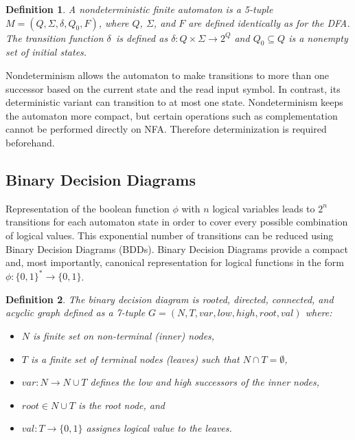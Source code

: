 \documentclass[pdflatex,sn-mathphys-num]{sn-jnl}%
\theoremstyle{thmstyleone}%
\theoremstyle{thmstyletwo}%
\theoremstyle{thmstylethree}%
\newtheorem{definition}{Definition}%
\begin{document}
        \begin{definition}
            A nondeterministic finite automaton is a 5-tuple $M = (Q, \Sigma, \delta, Q_0, F)$, where $Q$, $\Sigma$, and $F$ are defined identically as for the DFA. The transition function $\delta$~is defined as $\delta : Q \times \Sigma \rightarrow 2^{Q}$ and $Q_0 \subseteq Q$ is a nonempty set of initial states.
        \end{definition}

        Nondeterminism allows the automaton to make transitions to more than one successor based on the current state and the read input symbol. In contrast, its deterministic variant can transition to at most one state. Nondeterminism keeps the automaton more compact, but certain operations such as complementation cannot be performed directly on NFA. Therefore determinization is required beforehand.

    \subsection{Binary Decision Diagrams}
        Representation of the boolean function $\phi$ with $n$ logical variables leads to $2^n$ transitions for each automaton state in order to cover every possible combination of logical values. This exponential number of transitions can be reduced using Binary Decision Diagrams (BDDs). Binary Decision Diagrams provide a compact and, most importantly, canonical representation for logical functions in the form $\phi: \{0, 1\}^* \rightarrow \{0, 1\}$.

        \vspace*{0.5em}

        \begin{definition}
            The binary decision diagram \cite{BDD} is rooted, directed, connected, and acyclic graph defined as a 7-tuple $G = (N, T, var, low, high, root, val)$ where:
            \begin{itemize}[noindent]
                \item $N$ is finite set on non-terminal (inner) nodes,
                \item $T$ is a finite set of terminal nodes (leaves) such that $N \cap T = \emptyset$,
                \item $var : N \rightarrow N \cup T$ defines the low and high successors of the inner nodes,
                \item $root \in N \cup T$ is the root node, and
                \item $val : T \rightarrow \{0, 1\}$ assignes logical value to the leaves.
            \end{itemize}
        \end{definition}
\end{document}
